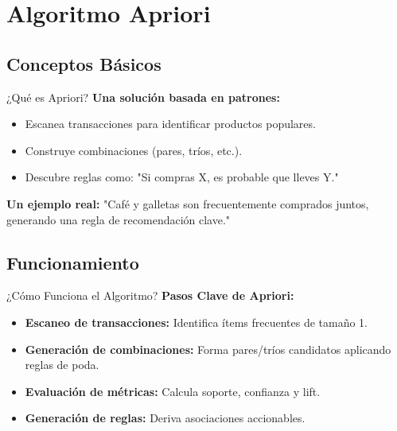 \documentclass{beamer}
\begin{document}
\section{Algoritmo Apriori}
\subsection{Conceptos Básicos}
\begin{frame}{¿Qué es Apriori?}
    \textbf{Una solución basada en patrones:}
    \begin{itemize}
        \item Escanea transacciones para identificar productos populares.
        \item Construye combinaciones (pares, tríos, etc.).
        \item Descubre reglas como: "Si compras X, es probable que lleves Y."
    \end{itemize}
    \textbf{Un ejemplo real:}
    "Café y galletas son frecuentemente comprados juntos, generando una regla de recomendación clave."
\end{frame}

\subsection{Funcionamiento}
\begin{frame}{¿Cómo Funciona el Algoritmo?}
    \textbf{Pasos Clave de Apriori:}  
    \begin{itemize}
        \item \textbf{Escaneo de transacciones:} Identifica ítems frecuentes de tamaño 1.
        \item \textbf{Generación de combinaciones:} Forma pares/tríos candidatos aplicando reglas de poda.
        \item \textbf{Evaluación de métricas:} Calcula soporte, confianza y lift.
        \item \textbf{Generación de reglas:} Deriva asociaciones accionables.
    \end{itemize}
\end{frame}
\end{document}
